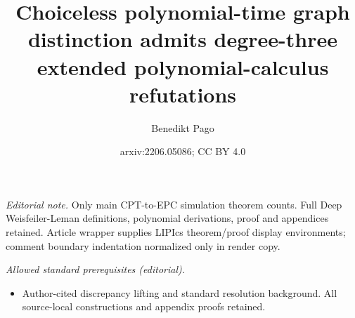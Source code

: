 \documentclass[10pt,a4paper]{article}
\title{Choiceless polynomial-time graph distinction admits degree-three extended polynomial-calculus refutations}
\author{Benedikt Pago}
\date{arxiv:2206.05086; CC BY 4.0}
\begin{document}
\maketitle
\noindent\textit{Editorial note.} Only main CPT-to-EPC simulation theorem counts. Full Deep Weisfeiler-Leman definitions, polynomial derivations, proof and appendices retained. Article wrapper supplies LIPIcs theorem/proof display environments; comment boundary indentation normalized only in render copy.\par\medskip
\noindent\textit{Allowed standard prerequisites (editorial).}\begin{itemize}
\item Author-cited discrepancy lifting and standard resolution background. All source-local constructions and appendix proofs retained.
\end{itemize}\medskip
	
\end{document}
